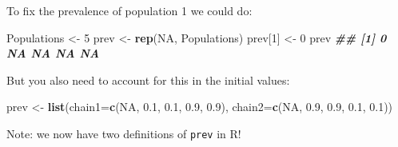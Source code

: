 \documentclass[
  ignorenonframetext,
]{beamer}
\newenvironment{Shaded}{\begin{snugshade}}{\end{snugshade}}
\newcommand{\AttributeTok}[1]{\textcolor[rgb]{0.13,0.29,0.53}{#1}}
\newcommand{\ConstantTok}[1]{\textcolor[rgb]{0.56,0.35,0.01}{#1}}
\newcommand{\DecValTok}[1]{\textcolor[rgb]{0.00,0.00,0.81}{#1}}
\newcommand{\DocumentationTok}[1]{\textcolor[rgb]{0.56,0.35,0.01}{\textbf{\textit{#1}}}}
\newcommand{\FloatTok}[1]{\textcolor[rgb]{0.00,0.00,0.81}{#1}}
\newcommand{\FunctionTok}[1]{\textcolor[rgb]{0.13,0.29,0.53}{\textbf{#1}}}
\newcommand{\NormalTok}[1]{#1}
\newcommand{\OtherTok}[1]{\textcolor[rgb]{0.56,0.35,0.01}{#1}}
\begin{document}
\begin{frame}[fragile]
To fix the prevalence of population 1 we could do:

\scriptsize

\begin{Shaded}
\begin{Highlighting}[]
\NormalTok{Populations }\OtherTok{\textless{}{-}} \DecValTok{5}
\NormalTok{prev }\OtherTok{\textless{}{-}} \FunctionTok{rep}\NormalTok{(}\ConstantTok{NA}\NormalTok{, Populations)}
\NormalTok{prev[}\DecValTok{1}\NormalTok{] }\OtherTok{\textless{}{-}} \DecValTok{0}
\NormalTok{prev}
\DocumentationTok{\#\# [1]  0 NA NA NA NA}
\end{Highlighting}
\end{Shaded}

\normalsize

\pause

But you also need to account for this in the initial values:

\scriptsize

\begin{Shaded}
\begin{Highlighting}[]
\NormalTok{prev }\OtherTok{\textless{}{-}} \FunctionTok{list}\NormalTok{(}\AttributeTok{chain1=}\FunctionTok{c}\NormalTok{(}\ConstantTok{NA}\NormalTok{, }\FloatTok{0.1}\NormalTok{, }\FloatTok{0.1}\NormalTok{, }\FloatTok{0.9}\NormalTok{, }\FloatTok{0.9}\NormalTok{), }\AttributeTok{chain2=}\FunctionTok{c}\NormalTok{(}\ConstantTok{NA}\NormalTok{, }\FloatTok{0.9}\NormalTok{, }\FloatTok{0.9}\NormalTok{, }\FloatTok{0.1}\NormalTok{, }\FloatTok{0.1}\NormalTok{))}
\end{Highlighting}
\end{Shaded}

\normalsize

Note: we now have two definitions of \texttt{prev} in R!
\end{frame}
\end{document}
